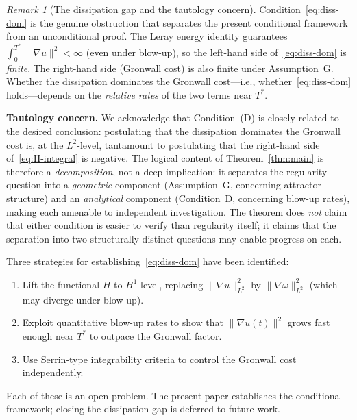 \documentclass[12pt,a4paper]{article}
\theoremstyle{definition}
\theoremstyle{plain}
\theoremstyle{remark}
\newtheorem{remark}[definition]{Remark}
\begin{document}
\begin{remark}[The dissipation gap and the tautology concern]\label{rem:diss-gap}
Condition~\eqref{eq:diss-dom} is the genuine obstruction that
separates the present conditional framework from an unconditional
proof.  The Leray energy identity guarantees
$\int_0^{T^*}\|\nabla u\|^2 < \infty$ (even under blow-up), so
the left-hand side of~\eqref{eq:diss-dom} is \emph{finite}.
The right-hand side (Gronwall cost) is also finite under
Assumption~G.  Whether the dissipation dominates the Gronwall
cost---i.e., whether~\eqref{eq:diss-dom} holds---depends on
the \emph{relative rates} of the two terms near $T^*$.

\medskip\noindent
\textbf{Tautology concern.}\;
We acknowledge that Condition~(D) is closely related to the
desired conclusion: postulating that the dissipation dominates
the Gronwall cost is, at the $L^2$-level, tantamount to postulating
that the right-hand side of~\eqref{eq:H-integral} is negative.
The logical content of Theorem~\ref{thm:main} is therefore
a \emph{decomposition}, not a deep implication: it separates the
regularity question into a \emph{geometric} component (Assumption~G,
concerning attractor structure) and an \emph{analytical} component
(Condition~D, concerning blow-up rates), making each amenable to
independent investigation.  The theorem does \emph{not} claim
that either condition is easier to verify than regularity itself;
it claims that the separation into two structurally distinct
questions may enable progress on each.

Three strategies for establishing~\eqref{eq:diss-dom} have been
identified:
\begin{enumerate}
  \item[\textup{(i)}]  Lift the functional $H$ to $H^1$-level,
    replacing $\|\nabla u\|_{L^2}^2$ by $\|\nabla\omega\|_{L^2}^2$
    (which may diverge under blow-up).
  \item[\textup{(ii)}]  Exploit quantitative blow-up rates to
    show that $\|\nabla u(t)\|^2$ grows fast enough near $T^*$
    to outpace the Gronwall factor.
  \item[\textup{(iii)}]  Use Serrin-type integrability criteria
    to control the Gronwall cost independently.
\end{enumerate}
Each of these is an open problem.  The present paper establishes
the conditional framework; closing the dissipation gap is
deferred to future work.


\end{remark}
\end{document}
